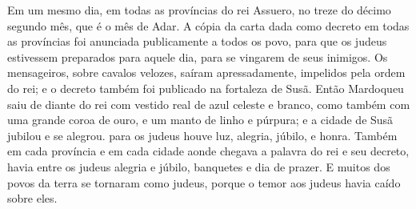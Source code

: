 {Em um mesmo dia, em todas as províncias do rei Assuero, no
{} treze do décimo segundo mês, que é o mês de Adar.
A cópia da carta dada como decreto em todas as províncias foi anunciada publicamente a todos os povo, para que os judeus estivessem preparados para aquele dia, para se vingarem de seus inimigos.
Os mensageiros, sobre cavalos velozes, saíram apressadamente, impelidos pela ordem do rei; e o decreto também foi publicado na fortaleza de Susã.
Então Mardoqueu saiu de diante do rei com vestido real de azul celeste e branco, como também com uma grande coroa de ouro, e um manto de linho e púrpura; e a cidade de Susã jubilou e se alegrou.
 para os judeus houve luz, alegria, júbilo, e honra.
Também em cada província e em cada cidade aonde chegava a palavra do rei e seu decreto, havia entre os judeus alegria e júbilo, banquetes e dia de prazer. E muitos dos povos da terra se tornaram como judeus, porque o temor aos judeus havia caído sobre eles.

}
